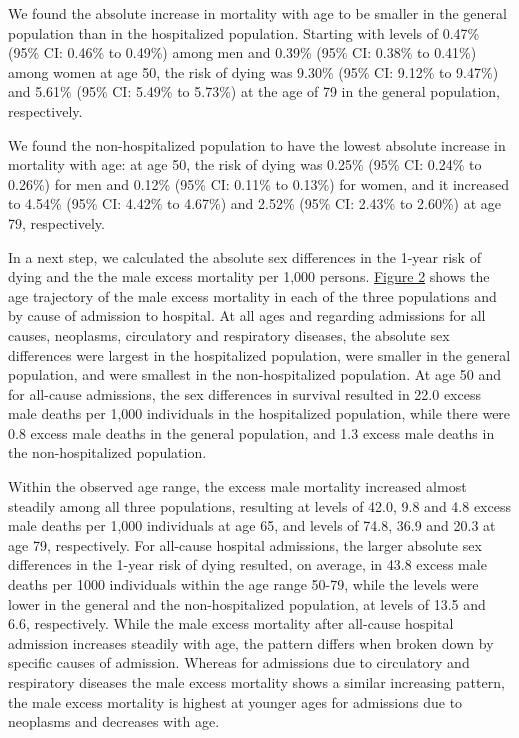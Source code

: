 We found the absolute increase in mortality with age to be smaller in 
the general population than in the hospitalized population. Starting 
with levels of 0.47\% (95\% CI: 0.46\% to 0.49\%) among men and 0.39\% 
(95\% CI: 0.38\% to 0.41\%) among women at age 50, the risk of dying 
was 9.30\% (95\% CI: 9.12\% to 9.47\%) and 5.61\% (95\% CI: 5.49\% to 
5.73\%) at the age of 79 in the general population, respectively.

We found the non-hospitalized population to have the lowest absolute 
increase in mortality with age: at age 50, the risk of dying was 0.25\% 
(95\% CI: 0.24\% to 0.26\%) for men and 0.12\% (95\% CI: 0.11\% to 0.13\%) 
for women, and it increased to 4.54\% (95\% CI: 4.42\% to 4.67\%) and 
2.52\% (95\% CI: 2.43\% to 2.60\%) at age 79, respectively.

In a next step, we calculated the absolute sex differences in the 
1-year risk of dying and the the male excess mortality per 1,000 persons. 
\hyperref[ch2:fig2]{Figure 2} shows the age trajectory of the male excess mortality in each 
of the three populations and by cause of admission to hospital. At all 
ages and regarding admissions for all causes, neoplasms, circulatory 
and respiratory diseases, the absolute sex differences were largest in 
the hospitalized population, were smaller in the general population, 
and were smallest in the non-hospitalized population. At age 50 and 
for all-cause admissions, the sex differences in survival resulted in 
22.0 excess male deaths per 1,000 individuals in the hospitalized 
population, while there were 0.8 excess male deaths in the general 
population, and 1.3 excess male deaths in the non-hospitalized population.

Within the observed age range, the excess male mortality increased 
almost steadily among all three populations, resulting at levels 
of 42.0, 9.8 and 4.8 excess male deaths per 1,000 individuals at 
age 65, and levels of 74.8, 36.9 and 20.3 at age 79, respectively. 
For all-cause hospital admissions, the larger absolute sex differences 
in the 1-year risk of dying resulted, on average, in 43.8 excess male 
deaths per 1000 individuals within the age range 50-79, while the 
levels were lower in the general and the non-hospitalized population, 
at levels of 13.5 and 6.6, respectively. While the male excess 
mortality after all-cause hospital admission increases steadily with 
age, the pattern differs when broken down by specific causes of admission. 
Whereas for admissions due to circulatory and respiratory diseases 
the male excess mortality shows a similar increasing pattern, the male 
excess mortality is highest at younger ages for admissions due to 
neoplasms and decreases with age.\\


